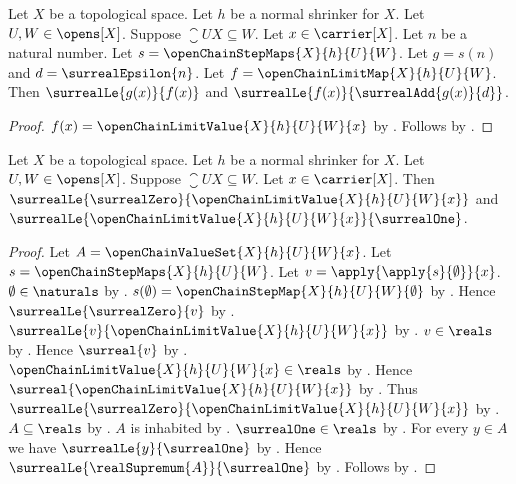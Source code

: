 \begin{corollary}\label{open_chain_limit_map_approximation}
    Let $X$ be a topological space.
    Let $h$ be a normal shrinker for $X$.
    Let $U,W\in\opens[X]$.
    Suppose $\closure{U}{X}\subseteq W$.
    Let $x\in\carrier[X]$.
    Let $n$ be a natural number.
    Let $s=\openChainStepMaps{X}{h}{U}{W}$.
    Let $g=s(n)$ and $d=\surrealEpsilon{n}$.
    Let $f=\openChainLimitMap{X}{h}{U}{W}$.
    Then $\surrealLe{g(x)}{f(x)}$ and
        $\surrealLe{f(x)}{\surrealAdd{g(x)}{d}}$.
\end{corollary}
\begin{proof}
    $f(x)=\openChainLimitValue{X}{h}{U}{W}{x}$
        by .
    Follows by .
\end{proof}

\begin{proposition}\label{open_chain_limit_value_between_zero_and_one}
    Let $X$ be a topological space.
    Let $h$ be a normal shrinker for $X$.
    Let $U,W\in\opens[X]$.
    Suppose $\closure{U}{X}\subseteq W$.
    Let $x\in\carrier[X]$.
    Then
        $\surrealLe{\surrealZero}
            {\openChainLimitValue{X}{h}{U}{W}{x}}$ and
        $\surrealLe{\openChainLimitValue{X}{h}{U}{W}{x}}
            {\surrealOne}$.
\end{proposition}
\begin{proof}
    Let $A=\openChainValueSet{X}{h}{U}{W}{x}$.
    Let $s=\openChainStepMaps{X}{h}{U}{W}$.
    Let $v=\apply{\apply{s}{\emptyset}}{x}$.
    $\emptyset\in\naturals$ by .
    $s(\emptyset)=\openChainStepMap{X}{h}{U}{W}{\emptyset}$
        by .
    Hence $\surrealLe{\surrealZero}{v}$
        by .
    $\surrealLe{v}{\openChainLimitValue{X}{h}{U}{W}{x}}$
        by .
    $v\in\reals$ by .
    Hence $\surreal{v}$ by .
    $\openChainLimitValue{X}{h}{U}{W}{x}\in\reals$
        by .
    Hence $\surreal{\openChainLimitValue{X}{h}{U}{W}{x}}$
        by .
    Thus $\surrealLe{\surrealZero}
        {\openChainLimitValue{X}{h}{U}{W}{x}}$
        by .
    $A\subseteq\reals$ by .
    $A$ is inhabited by .
    $\surrealOne\in\reals$ by .
    For every $y\in A$ we have $\surrealLe{y}{\surrealOne}$
        by .
    Hence $\surrealLe{\realSupremum{A}}{\surrealOne}$
        by .
    Follows by .
\end{proof}

